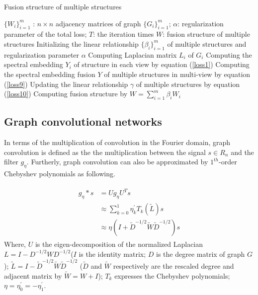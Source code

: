\documentclass[review]{elsarticle}
\begin{document}
\begin{algorithm}[ht]
  \caption{Fusion structure of multiple structures}
 \begin{algorithmic}[1]
 \label{alg1}
\renewcommand{\algorithmicrequire}{\textbf{Input:}}
\renewcommand{\algorithmicensure}{\textbf{Output:}}
\renewcommand{\algorithmicreturn}{\textbf{Iteration:}}
   \REQUIRE $\{W_{i}\}_{i=1}^{m}$ : $n\times n$ adjacency matrices of graph $\{G_{i}\}_{i=1}^{m}$; $\alpha$: regularization parameter of the total loss; $T$: the iteration times
   \ENSURE $W$: fusion structure of multiple structures
   \STATE Initializing the linear relationship $\{\beta_{i}\}_{i=1}^{m}$ of multiple structures and regularization parameter $\alpha$
   \STATE Computing Laplacian matrix $L_{i}$ of $G_{i}$
   \STATE Computing the spectral embedding $Y_{i}$ of structure in each view by equation (\ref{loss1})
   \STATE Computing the spectral embedding fusion $Y$ of multiple structures  in multi-view by equation (\ref{loss9})
   \STATE Updating the linear relationship $\gamma$ of multiple structures by equation (\ref{loss10})
   \ENDFOR
   \STATE Computing fusion structure by $W=\sum_{i=1}^{m}\beta_{i}W_{i}$
  \end{algorithmic}
\end{algorithm}

\subsection{Graph convolutional networks}
In terms of the multiplication of convolution in the Fourier domain, graph convolution is defined as the the multiplication between the signal $s\in R_{n}$ and the filter $g_{\eta}$\cite{bruna2013spectral}. Furtherly, graph convolution can also be approximated by $1^{th}$-order Chebyshev polynomials \cite{kipf2016semi} as following.

\begin{align}
\label{gcn1}
\begin{aligned}
g_{\eta}\ast s&=Ug_{\eta}U^{T}s\\
&\approx \sum_{k=0}^{1}\eta^{'}_{k} T_{k}(\tilde{L})s\\
&\approx \eta(I+\tilde{D}^{-1/2}\tilde{W}\tilde{D}^{-1/2})s
\end{aligned}
\end{align}
Where, $U$ is the eigen-decomposition of the normalized Laplacian $L=I-D^{-1/2}WD^{-1/2}$($I$ is the identity matrix; $D$ is the degree matrix of graph $G$); $\tilde{L}=I-\tilde{D}^{-1/2}\tilde{W}\tilde{D}^{-1/2}$ ($\tilde{D}$ and $\tilde{W}$ respectively are the rescaled degree and adjacent matrix  by $\tilde{W}=W+I$); $T_{k}$ expresses the Chebyshev polynomials; $\eta=\eta_{0}^{'}=-\eta_{1}^{'}$.
\end{document}
